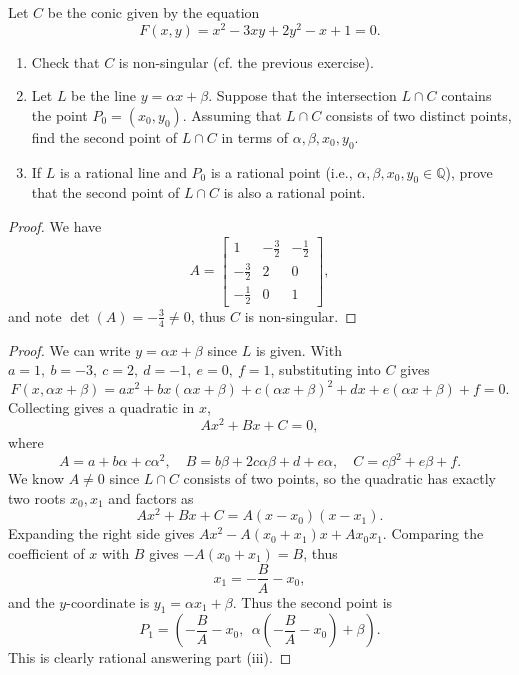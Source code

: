 \newpage
\begin{tcolorbox}[title=Problem 3, breakable]
    Let $C$ be the conic given by the equation 
    \[F(x,y) = x^2 - 3xy + 2y^2 - x + 1 = 0.\]
    \begin{enumerate}
        \item Check that $C$ is non-singular (cf. the previous exercise).
        \item Let $L$ be the line $y = \alpha x + \beta$. Suppose that the intersection $L \cap C$ contains the point 
        $P_0 = (x_0, y_0)$. Assuming that $L \cap C$ consists of two distinct points, find the second point 
        of $L \cap C$ in terms of $\alpha, \beta, x_0, y_0$.
        \item If $L$ is a rational line and $P_0$ is a rational point (i.e., $\alpha, \beta, x_0, y_0 \in \mathbb{Q}$),
        prove that the second point of $L \cap C$ is also a rational point.
    \end{enumerate}
\end{tcolorbox}

\begin{proof}
    We have
    \[
    A = \begin{bmatrix}
    1 & -\tfrac{3}{2} & -\tfrac{1}{2} \\[4pt]
    -\tfrac{3}{2} & 2 & 0 \\[4pt]
    -\tfrac{1}{2} & 0 & 1
    \end{bmatrix},
    \]
    and note $\det(A) = -\tfrac{3}{4} \ne 0$, thus $C$ is non-singular.
\end{proof}

\begin{proof}
    We can write $y = \alpha x + \beta$ since $L$ is given. With
    $a=1,\ b=-3,\ c=2,\ d=-1,\ e=0,\ f=1$, substituting into $C$ gives
    \[F(x, \alpha x + \beta) 
    = a x^2 
    + b x\left(\alpha x + \beta\right)
    + c\left(\alpha x + \beta\right)^2 
    + d x 
    + e\left(\alpha x + \beta\right)
    + f = 0.\]
    Collecting gives a quadratic in $x$,
    \[
    A x^2 + B x + C = 0,
    \]
    where
    \[A = a + b\alpha + c\alpha^2, \quad B = b\beta + 2c\alpha\beta + d + e\alpha, \quad C = c\beta^2 + e\beta + f.\]
    We know $A \ne 0$ since $L \cap C$ consists of two points, so the quadratic
    has exactly two roots $x_0, x_1$ and factors as
    \[
    A x^2 + B x + C = A(x - x_0)(x - x_1).
    \]
    Expanding the right side gives $A x^2 - A(x_0 + x_1)x + A x_0 x_1$. Comparing the
    coefficient of $x$ with $B$ gives $-A(x_0 + x_1) = B$, thus
    \[
    x_1 = -\frac{B}{A} - x_0,
    \]
    and the $y$-coordinate is $y_1 = \alpha x_1 + \beta$. Thus the second point is
    \[
    P_1 = \left(-\frac{B}{A} - x_0,\ \ \alpha\left(-\frac{B}{A} - x_0\right) + \beta\right).
    \]
    This is clearly rational answering part (iii).
\end{proof}

